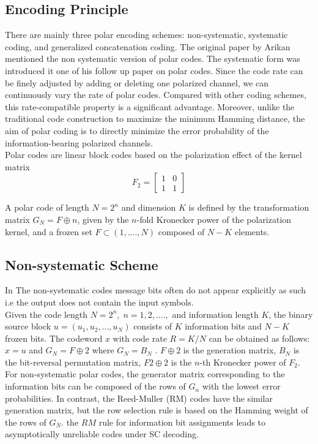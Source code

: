 \documentclass{report}
\begin{document}
\subsection*{Encoding Principle}
There are mainly three polar encoding schemes: non-systematic, systematic coding, and generalized concatenation coding. The original paper by Arikan mentioned the non systematic version of polar codes. The systematic form was introduced it one of his follow up paper on polar codes. Since the code rate can be finely adjusted by adding or deleting one polarized channel, we can continuously vary the rate of polar codes. Compared with other coding schemes, this rate-compatible property is a significant advantage. Moreover, unlike the traditional code construction to maximize the minimum Hamming distance, the aim of polar coding is to directly minimize the error probability of the information-bearing polarized channels.\\

Polar codes are linear block codes based on the polarization
effect of the kernel matrix \[F_{2} = 
\begin{bmatrix}
1 & 0\\
1 & 1
\end{bmatrix}
\]

A polar code of length $N = 2^n$ and dimension $K$ is defined by the transformation matrix $G_N = F \oplus n$, given by the $n$-fold Kronecker power of the polarization kernel, and a frozen set $F \subset ({1,....,N})$ composed of $N-K$ elements.\\

\subsection*{Non-systematic Scheme}
In The non-systematic codes message bits often do not appear explicitly as such i.e the output does not contain the input symbols.\\

Given the code length $N = 2^n,\; n = 1, 2,....,$ and information length $K$, the binary source block $u = (u_1, u_2, ... , u_N)$ consists of $K$ information bits and $N - K$ frozen bits. The codeword $x$ with code rate $R = K/N$ can be obtained as follows:\\

$x = u$ and $G_N = F \oplus 2$ where $G_N = B_N$ . $F\oplus2$ is the generation matrix, $B_N$ is the bit-reversal permutation matrix, $F2 \oplus2$ is the $n$-th Kronecker power of $F_2$. For non-systematic polar codes, the generator matrix corresponding to the information bits can be composed of the rows of $G_n$ with the lowest error probabilities. In contrast, the Reed-Muller (RM) codes have the similar generation matrix, but the row selection rule is based on the Hamming weight of the rows of $G_N$. the $RM$ rule for information bit assignments leads to asymptotically unreliable codes under SC decoding.\\
\end{document}
